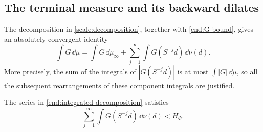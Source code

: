\subsection{The terminal measure and its backward dilates}

The decomposition in \cref{scale:decomposition}, together with
\cref{end:G-bound}, gives an absolutely convergent identity
\begin{equation}\label{end:integrated-decomposition}
 \int G\,\dd\mu
 =\int G\,\dd\mu_\infty
  +\sum_{j=1}^{\infty}\int G(S^{-j}d)\,\dd\nu(d).
\end{equation}
More precisely, the sum of the integrals of $|G(S^{-j}d)|$ is at most
$\int|G|\,\dd\mu$, so all the subsequent rearrangements of these
component integrals are justified.

\begin{lemma}
\label{end:terminal}
The series in \cref{end:integrated-decomposition} satisfies
\begin{equation}\label{end:terminal-strict}
 \sum_{j=1}^{\infty}\int G(S^{-j}d)\,\dd\nu(d)<H_\Phi.
\end{equation}
\end{lemma}

